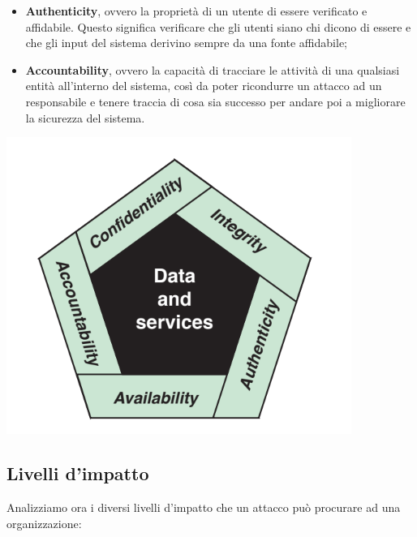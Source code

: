\documentclass[14pt]{extarticle}
\begin{document}
\begin{itemize}
    \item \textbf{Authenticity}, ovvero la proprietà di un utente di essere
    verificato e affidabile. Questo significa verificare che gli utenti siano
    chi dicono di essere e che gli input del sistema derivino sempre da una
    fonte affidabile;
    \item \textbf{Accountability}, ovvero la capacità di tracciare le attività
    di una qualsiasi entità all'interno del sistema, così da poter ricondurre un
    attacco ad un responsabile e tenere traccia di cosa sia successo per andare
    poi a migliorare la sicurezza del sistema. 
\end{itemize}

\begin{center}
    \includegraphics{images/CIA.png}
\end{center}

\newpage
\subsection{Livelli d'impatto}

Analizziamo ora i diversi livelli d'impatto che un attacco può procurare ad una
organizzazione:
\end{document}
